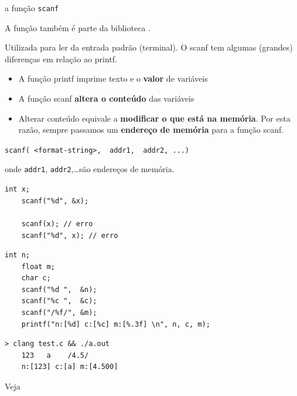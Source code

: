 \documentclass{beamer}
\begin{document}
\begin{frame}{a função \texttt{scanf}}

  A função  também é parte da biblioteca .
  
  Utilizada para ler da entrada padrão (terminal). O scanf tem algumas
  (grandes) diferenças em relação ao printf.
  
  \begin{itemize}
  \item A função printf imprime texto e o \textbf{valor} de variáveis
  \item A função scanf \textbf{altera o conteúdo} das variáveis
  \item Alterar conteúdo equivale a \textbf{modificar o que está na
      memória}. Por esta razão, sempre passamos um \textbf{endereço de
      memória} para a função scanf.
  \end{itemize}

  \framebreak

  \texttt{scanf({\color{red} <format-string>}, {\color{green} addr1}, {\color{green} addr2}, ...)}

  onde \texttt{addr1}, \texttt{addr2},\ldots são endereços de
  memória.

  \vspace{.6cm}

  \begin{lstlisting}[style=normalc]
    int x;
    scanf("%d", &x);

    scanf(x); // erro
    scanf("%d", x); // erro
  \end{lstlisting}
    
  \framebreak

  \begin{lstlisting}[style=normalc]
    int n;
    float m;
    char c;
    scanf("%d ",  &n);
    scanf("%c ",  &c);
    scanf("/%f/", &m);
    printf("n:[%d] c:[%c] m:[%.3f] \n", n, c, m);
  \end{lstlisting}

  \begin{lstlisting}[style=code]
    > clang test.c && ./a.out
    123   a    /4.5/
    n:[123] c:[a] m:[4.500]
  \end{lstlisting}

  Veja 

\end{frame}
\end{document}
